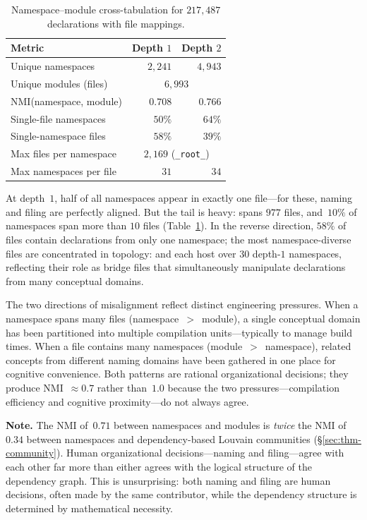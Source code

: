 \begin{table}[ht]
\centering
\caption{Namespace--module cross-tabulation for $217{,}487$ declarations with file mappings.}
\label{tab:ns-mod-cross}
\begin{tabular}{lrr}
\toprule
Metric & Depth $1$ & Depth $2$ \\
\midrule
Unique namespaces              & $2{,}241$  & $4{,}943$ \\
Unique modules (files)         & \multicolumn{2}{c}{$6{,}993$} \\
NMI(namespace, module)         & $0.708$    & $0.766$ \\
Single-file namespaces         & $50\%$     & $64\%$ \\
Single-namespace files         & $58\%$     & $39\%$ \\
Max files per namespace        & \multicolumn{2}{c}{$2{,}169$ (\texttt{\_root\_})} \\
Max namespaces per file        & $31$       & $34$ \\
\bottomrule
\end{tabular}
\end{table}

At depth~$1$, half of all namespaces appear in exactly one file---for these, naming and filing are perfectly aligned. But the tail is heavy:  spans $977$ files, and~$10\%$ of namespaces span more than $10$ files (Table~\ref{tab:ns-mod-cross}). In the reverse direction, $58\%$ of files contain declarations from only one namespace; the most namespace-diverse files are concentrated in topology:  and  each host over $30$ depth-$1$ namespaces, reflecting their role as bridge files that simultaneously manipulate declarations from many conceptual domains.

The two directions of misalignment reflect distinct engineering pressures. When a namespace spans many files (namespace~$>$~module), a single conceptual domain has been partitioned into multiple compilation units---typically to manage build times. When a file contains many namespaces (module~$>$~namespace), related concepts from different naming domains have been gathered in one place for cognitive convenience. Both patterns are rational organizational decisions; they produce NMI~$\approx 0.7$ rather than~$1.0$ because the two pressures---compilation efficiency and cognitive proximity---do not always agree.

\noindent\textbf{Note.}
\label{rem:two-pressures}
The NMI of~$0.71$ between namespaces and modules is \emph{twice} the NMI of~$0.34$ between namespaces and dependency-based Louvain communities (\S\ref{sec:thm-community}). Human organizational decisions---naming and filing---agree with each other far more than either agrees with the logical structure of the dependency graph. This is unsurprising: both naming and filing are human decisions, often made by the same contributor, while the dependency structure is determined by mathematical necessity.

